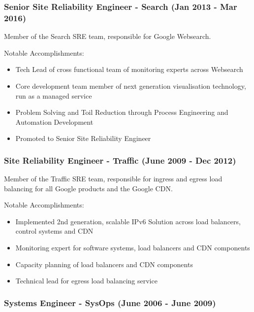 \documentclass[a4paper, 10pt] {article}
\begin{document}
\subsubsection*{Senior Site Reliability Engineer - Search (Jan 2013 - Mar 2016)}

Member of the Search SRE team, responsible for Google Websearch.

\vspace{4mm}  %

Notable Accomplishments:

\begin{itemize}[itemsep=2pt,parsep=2pt]
  \item Tech Lead of cross functional team of monitoring experts across Websearch
  \item Core development team member of next generation visualisation technology, run as a managed service
  \item Problem Solving and Toil Reduction through Process Engineering and Automation Development
  \item Promoted to Senior Site Reliability Engineer
\end{itemize}

\subsubsection*{Site Reliability Engineer - Traffic (June 2009 - Dec 2012)}

Member of the Traffic SRE team, responsible for ingress and egress load balancing for all Google products and the Google CDN. 

\vspace{4mm}  %

Notable Accomplishments:

\begin{itemize}[itemsep=2pt,parsep=2pt]
  \item Implemented 2nd generation, scalable IPv6 Solution across load balancers, control systems and CDN
  \item Monitoring expert for software systems, load balancers and CDN components 
  \item Capacity planning of load balancers and CDN components
  \item Technical lead for egress load balancing service
\end{itemize}

\subsubsection*{Systems Engineer - SysOps (June 2006 - June 2009)}
\end{document}
